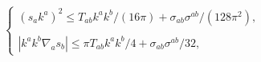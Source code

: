 \begin{equation}\left\{\begin{array}{l}
(s_a k^a)^2 \le T_{ab} k^a k^b / (16 \pi) + {\sigma_{ab}}{\sigma^{ab}} / 
(128 {\pi}^{2}), \\  \\
|k^a k^b \nabla_a s_b| \le \pi T_{ab} k^a k^b /4 + {\sigma_{ab}}{\sigma^{ab}} /
 32, \end{array} \right.\label{eq:fmw2}
\end{equation}

